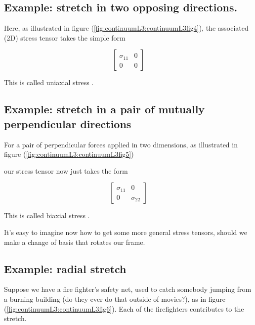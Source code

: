 \subsection{Example: stretch in two opposing directions.}


Here, as illustrated in figure (\ref{fig:continuumL3:continuumL3fig4}), the associated (2D) stress tensor takes the simple form

\begin{equation}\label{eqn:continuumL3:370}
\begin{bmatrix}
\sigma_{11} & 0 \\
0 & 0
\end{bmatrix}
\end{equation}

This is called uniaxial stress .

\subsection{Example: stretch in a pair of mutually perpendicular directions}

For a pair of perpendicular forces applied in two dimensions, as illustrated in figure (\ref{fig:continuumL3:continuumL3fig5})

our stress tensor now just takes the form

\begin{equation}\label{eqn:continuumL3:390}
\begin{bmatrix}
\sigma_{11} & 0 \\
0 & \sigma_{22}
\end{bmatrix}
\end{equation}

This is called biaxial stress .

It's easy to imagine now how to get some more general stress tensors, should we make a change of basis that rotates our frame.

\subsection{Example: radial stretch}

Suppose we have a fire fighter's safety net, used to catch somebody jumping from a burning building (do they ever do that outside of movies?), as in figure (\ref{fig:continuumL3:continuumL3fig6}).  Each of the firefighters contributes to the stretch.  

